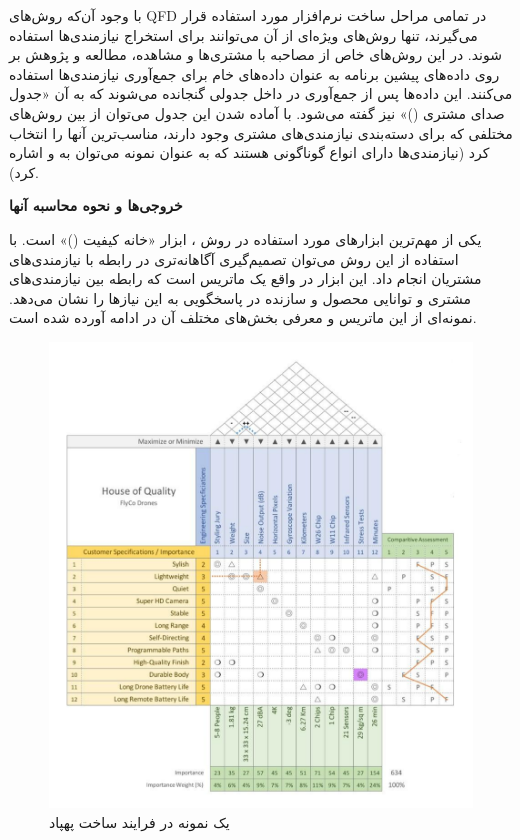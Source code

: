 {\begin{enumerate}[a)]
با وجود آن‌که روش‌های QFD در تمامی مراحل ساخت نرم‌افزار مورد استفاده قرار می‌گیرند، تنها روش‌های ویژه‌ای از آن می‌توانند برای استخراج نیازمندی‌ها استفاده شوند. در این روش‌های خاص از مصاحبه با مشتری‌ها و مشاهده، مطالعه و پژوهش‌ بر روی داده‌های پیشین برنامه به عنوان داده‌های خام برای جمع‌آوری نیازمندی‌ها استفاده می‌کنند. این داده‌ها پس از جمع‌آوری در داخل جدولی گنجانده می‌شوند که به آن «جدول صدای مشتری ()» نیز گفته می‌شود. با آماده شدن این جدول می‌توان از بین روش‌های مختلفی که برای دسته‌بندی نیازمندی‌های مشتری وجود دارند، مناسب‌ترین آنها را انتخاب کرد (نیازمندی‌ها دارای انواع گوناگونی هستند که به عنوان نمونه می‌توان به  و  اشاره کرد)\cite{swbook}.

\textbf{خروجی‌ها و نحوه محاسبه آنها}

یکی از مهم‌ترین ابزارهای مورد استفاده در روش ، ابزار «خانه کیفیت ()» است\cite{sixsigma}. با استفاده از این روش می‌توان تصمیم‌گیری آگاهانه‌تری در رابطه با نیازمندی‌های مشتریان انجام داد. این ابزار در واقع یک ماتریس است که رابطه بین نیازمندی‌های مشتری و توانایی محصول و سازنده در پاسخگویی به این نیازها را نشان می‌دهد. نمونه‌ای از این ماتریس و معرفی بخش‌های مختلف آن در ادامه آورده شده است.

\begin{figure}[h]
	\centering
	\includegraphics[scale=0.55]{figs/2-1.pdf}
	\caption{یک نمونه  در فرایند ساخت پهپاد}
	\label{fig2}
\end{figure}


\end{enumerate}}
